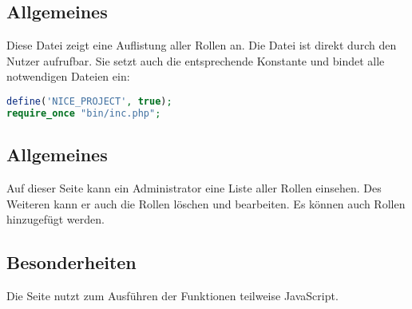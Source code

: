 \subsection{Allgemeines} Diese Datei zeigt eine Auflistung aller Rollen an.
Die Datei ist direkt durch den Nutzer aufrufbar. Sie setzt auch die entsprechende Konstante und bindet alle notwendigen Dateien ein:
\begin{lstlisting}[language=php]
define('NICE_PROJECT', true);
require_once "bin/inc.php";
\end{lstlisting}
\subsection{Allgemeines}
Auf dieser Seite kann ein Administrator eine Liste aller Rollen einsehen. Des Weiteren kann er auch die Rollen löschen und bearbeiten. Es können auch Rollen hinzugefügt werden.
\subsection{Besonderheiten}
Die Seite nutzt zum Ausführen der Funktionen teilweise JavaScript.
